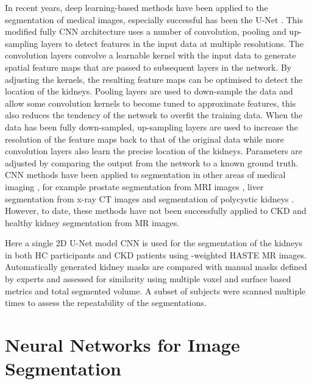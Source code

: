 In recent years, deep learning-based methods have been applied to the segmentation of medical images, especially successful has been the U-Net \cite{ronneberger_u-net_2015}. This modified fully \ac{CNN} architecture uses a number of convolution, pooling and up-sampling layers to detect features in the input data at multiple resolutions. The convolution layers convolve a learnable kernel with the input data to generate spatial feature maps that are passed to subsequent layers in the network. By adjusting the kernels, the resulting feature maps can be optimised to detect the location of the kidneys. Pooling layers are used to down-sample the data and allow some convolution kernels to become tuned to approximate features, this also reduces the tendency of the network to overfit the training data. When the data has been fully down-sampled, up-sampling layers are used to increase the resolution of the feature maps back to that of the original data while more convolution layers also learn the precise location of the kidneys. Parameters are adjusted by comparing the output from the network to a known ground truth. \ac{CNN} methods have been applied to segmentation in other areas of medical imaging \cite{lu_automatic_2017, sharma_automatic_2017, wachinger_deepnat_2018, fu_novel_2018}, for example prostate segmentation from \ac{MRI} images \cite{hassanzadeh_convolutional_2019}, liver segmentation from x-ray \ac{CT} images \cite{li_h-denseunet_2018} and segmentation of polycystic kidneys \cite{kline_performance_2017, van_gastel_automatic_2019, shin_expert-level_2020}. However, to date, these methods have not been successfully applied to \ac{CKD} and healthy kidney segmentation from MR images. 

Here a single 2D U-Net model \ac{CNN} is used for the segmentation of the kidneys in both \ac{HC} participants and \ac{CKD} patients using \ttwo-weighted \ac{HASTE} MR images. Automatically generated kidney masks are compared with manual masks defined by experts and assessed for similarity using multiple voxel and surface based metrics and total segmented volume. A subset of subjects were scanned multiple times to assess the repeatability of the segmentations.

\newpage

\section{Neural Networks for Image Segmentation}

